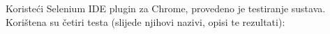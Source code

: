 			 
			
			Koristeći Selenium IDE plugin za Chrome, provedeno je testiranje sustava. Korištena su četiri testa (slijede njihovi nazivi, opisi te rezultati):

